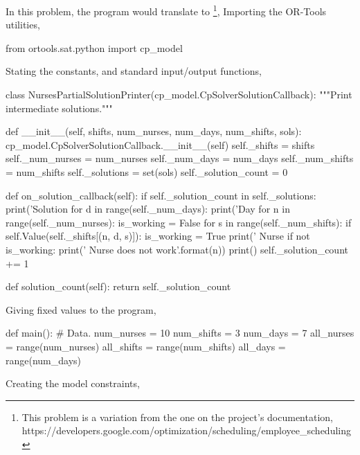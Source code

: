 \documentclass[
12pt,				%
openright,			%
oneside,			%
a4paper,			%
brazil,				%
english,			%
]{abntex2}
\begin{document}
In this problem, the program would translate to \footnote{This problem
is a variation from the one on the project's documentation, https://developers.google.com/optimization/scheduling/employee_scheduling},
Importing the OR-Tools utilities,

\begin{python}
  from ortools.sat.python import cp_model
\end{python}

Stating the constants, and standard input/output functions,

\begin{python}
class NursesPartialSolutionPrinter(cp_model.CpSolverSolutionCallback):
    """Print intermediate solutions."""

    def __init__(self, shifts, num_nurses, num_days, num_shifts, sols):
        cp_model.CpSolverSolutionCallback.__init__(self)
        self._shifts = shifts
        self._num_nurses = num_nurses
        self._num_days = num_days
        self._num_shifts = num_shifts
        self._solutions = set(sols)
        self._solution_count = 0

    def on_solution_callback(self):
        if self._solution_count in self._solutions:
            print('Solution %
            for d in range(self._num_days):
                print('Day %
                for n in range(self._num_nurses):
                    is_working = False
                    for s in range(self._num_shifts):
                        if self.Value(self._shifts[(n, d, s)]):
                            is_working = True
                            print('  Nurse %
                    if not is_working:
                        print('  Nurse {} does not work'.format(n))
            print()
        self._solution_count += 1

    def solution_count(self):
        return self._solution_count
\end{python}

Giving fixed values to the program,

\begin{python}
def main():
    # Data.
    num_nurses = 10
    num_shifts = 3
    num_days = 7
    all_nurses = range(num_nurses)
    all_shifts = range(num_shifts)
    all_days = range(num_days)
\end{python}

Creating the model constraints,
\end{document}
